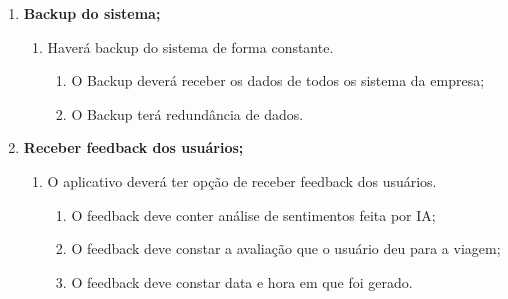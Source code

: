\begin{enumerate}
\begin{enumerate}
\begin{enumerate}
                        \end{enumerate}
            \end{enumerate}




      \item \textbf{Backup do sistema;}
            \begin{enumerate}

                  \item	Haverá backup do sistema de forma constante.
                        \begin{enumerate}
                              \item O Backup deverá receber os dados de todos os sistema da empresa;
                              \item O Backup terá redundância de dados.


                        \end{enumerate}
            \end{enumerate}

      \item \textbf{Receber feedback dos usuários;}
            \begin{enumerate}

                  \item O aplicativo deverá ter opção de receber feedback dos usuários.
                        \begin{enumerate}
                              \item O feedback deve conter análise de sentimentos feita por IA;
                              \item O feedback deve constar a avaliação que o usuário deu para a viagem;
                              \item O feedback deve constar data e hora em que foi gerado.


\end{enumerate}
\end{enumerate}
\end{enumerate}
